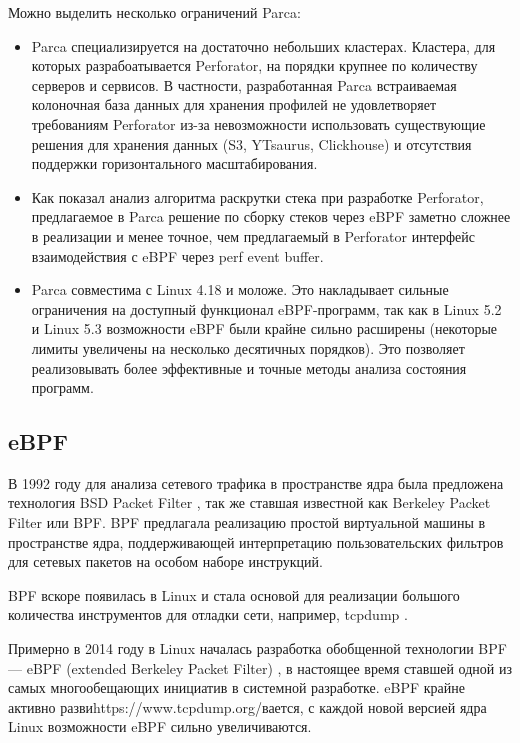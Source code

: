Можно выделить несколько ограничений Parca:
\begin{itemize}
    \item
        Parca специализируется на достаточно небольших кластерах. Кластера, для которых разрабоатывается Perforator, на порядки крупнее
        по количеству серверов и сервисов. В частности, разработанная Parca встраиваемая колоночная база данных для хранения профилей
        не удовлетворяет требованиям Perforator из-за невозможности использовать существующие решения для хранения данных
        (S3, YTsaurus, Clickhouse) и отсутствия поддержки горизонтального масштабирования.

    \item
        Как показал анализ алгоритма раскрутки стека при разработке Perforator, предлагаемое в Parca решение по сборку стеков через eBPF
        заметно сложнее в реализации и менее точное, чем предлагаемый в Perforator интерфейс взаимодействия с eBPF через perf event buffer.

    \item
        Parca совместима с Linux 4.18 и моложе. Это накладывает сильные ограничения на доступный функционал eBPF-программ, так как в
        Linux 5.2 и Linux 5.3 возможности eBPF были крайне сильно расширены (некоторые лимиты увеличены на несколько десятичных порядков).
        Это позволяет реализовывать более эффективные и точные методы анализа состояния программ.
\end{itemize}

\subsection{eBPF} \label{sec:ebpf}
В 1992 году для анализа сетевого трафика в пространстве ядра была предложена технология BSD Packet Filter \cite{bpf},
так же ставшая известной как Berkeley Packet Filter или BPF.
BPF предлагала реализацию простой виртуальной машины в пространстве ядра, поддерживающей интерпретацию пользовательских фильтров для
сетевых пакетов на особом наборе инструкций.

BPF вскоре появилась в Linux и стала основой для реализации большого количества инструментов для отладки сети,
например, tcpdump \cite{tcpdump, tcpdump:bpf}.

Примерно в 2014 году в Linux началась разработка обобщенной технологии BPF ---
eBPF (extended Berkeley Packet Filter) \cite{ebpf:kernel, ebpf:cilium},
в настоящее время ставшей одной из самых многообещающих инициатив в системной разработке.
eBPF крайне активно развиhttps://www.tcpdump.org/вается, с каждой новой версией ядра Linux возможности eBPF сильно увеличиваются.

